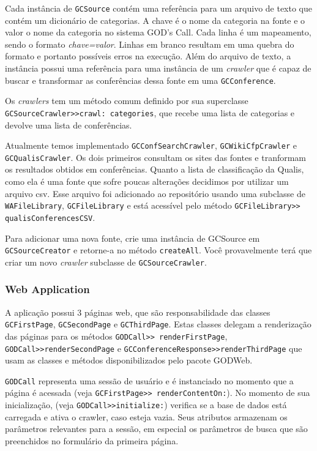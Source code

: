 Cada instância de \texttt{GCSource} contém uma referência para um arquivo de texto que contém um dicionário de categorias. 
A chave é o nome da categoria na fonte e o valor o nome da 
categoria no sistema GOD's Call. Cada linha é um mapeamento, sendo o formato \textit{chave=valor}. Linhas em branco resultam em uma quebra do formato e portanto possíveis 
erros na execução. Além do arquivo de texto, a instância possui uma referência para uma instância de um \textit{crawler} que é capaz de buscar e transformar as conferências dessa 
fonte em uma \texttt{GCConference}.

Os \textit{crawlers} tem um método comum definido por sua superclasse \texttt{GCSourceCrawler>>crawl: categories}, que recebe uma lista de categorias e devolve uma lista de conferências.

Atualmente temos implementado \texttt{GCConfSearchCrawler}, \texttt{GCWikiCfpCrawler} e \texttt{GCQualisCrawler}. 
Os dois primeiros consultam os sites das fontes e tranformam os resultados obtidos em conferências. 
Quanto a lista de classificação da Qualis, como ela é uma fonte que sofre poucas alterações decidimos por utilizar um arquivo csv. Esse arquivo foi adicionado ao repositório usando uma subclasse de \texttt{WAFileLibrary}, \texttt{GCFileLibrary} e está acessível pelo método \texttt{GCFileLibrary>> qualisConferencesCSV}. 

Para adicionar uma nova fonte, crie uma instância de GCSource em \texttt{GCSourceCreator} e retorne-a no método \texttt{createAll}. Você provavelmente terá que criar um novo \textit{crawler} subclasse de \texttt{GCSourceCrawler}.

\subsubsection{Web Application} %

A aplicação possui 3 páginas web, que são responsabilidade das classes \texttt{GCFirstPage}, \texttt{GCSecondPage} e \texttt{GCThirdPage}. Estas classes delegam a renderização das páginas para os métodos \texttt{GODCall>> renderFirstPage}, \texttt{GODCall>>renderSecondPage} e \texttt{GCConferenceResponse>>renderThirdPage} que usam as classes e métodos disponibilizados pelo pacote GODWeb.

\texttt{GODCall} representa uma sessão de usuário e é instanciado no momento que a página é acessada (veja \texttt{GCFirstPage>> renderContentOn:}). No momento de sua inicialização, (veja \texttt{GODCall>>initialize:}) verifica se a base de dados está carregada e ativa o crawler, caso esteja vazia. Seus atributos armazenam os parâmetros relevantes para a sessão, em especial os parâmetros de busca que são preenchidos no formulário da primeira página.

